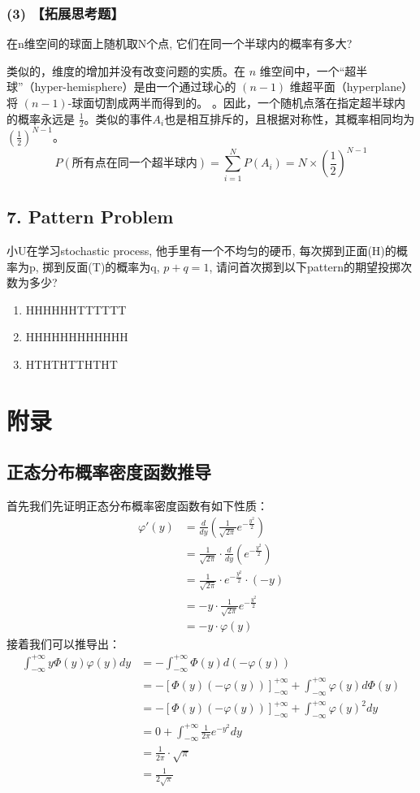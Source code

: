 \documentclass[UTF8]{ctexart}
\begin{document}
\subsubsection*{(3) 【拓展思考题】}
在n维空间的球面上随机取N个点, 它们在同一个半球内的概率有多大?

类似的，维度的增加并没有改变问题的实质。在 $n$ 维空间中，一个“超半球”（hyper-hemisphere）是由一个通过球心的 $(n-1)$ 维超平面（hyperplane）将 $(n-1)$-球面切割成两半而得到的。
。因此，一个随机点落在指定超半球内的概率永远是 $\frac{1}{2}$。类似的事件$A_i$也是相互排斥的，且根据对称性，其概率相同均为$(\frac{1}{2})^{N-1}$。
$$ P(\text{所有点在同一个超半球内}) = \sum_{i=1}^{N} P(A_i) = N \times \left(\frac{1}{2}\right)^{N-1} $$
\subsection*{7. Pattern Problem}
小U在学习stochastic process, 他手里有一个不均匀的硬币, 每次掷到正面(H)的概率为p, 掷到反面(T)的概率为q, $p+q=1$, 请问首次掷到以下pattern的期望投掷次数为多少?
\begin{enumerate}
    \item HHHHHHTTTTTT
    \item HHHHHHHHHHHH
    \item HTHTHTTHTHT
\end{enumerate}



\section*{附录}

\subsection*{正态分布概率密度函数推导}
首先我们先证明正态分布概率密度函数有如下性质：
$$
\begin{align*}
    \varphi'(y) &= \frac{d}{dy}\left(\frac{1}{\sqrt{2\pi}}e^{-\frac{y^2}{2}}\right) \\
    &= \frac{1}{\sqrt{2\pi}} \cdot \frac{d}{dy}\left(e^{-\frac{y^2}{2}}\right) \\
    &= \frac{1}{\sqrt{2\pi}} \cdot e^{-\frac{y^2}{2}} \cdot \left(-y\right) \\
    &= -y \cdot \frac{1}{\sqrt{2\pi}}e^{-\frac{y^2}{2}} \\
    &= -y \cdot \varphi(y)
\end{align*}
$$
接着我们可以推导出：
$$
\begin{align*}
    \int_{-\infty}^{+\infty} y\Phi(y)\varphi(y)dy
    &= -\int_{-\infty}^{+\infty} \Phi(y)d(-\varphi(y)) \\
    &= -\left[\Phi(y)(-\varphi(y))\right]_{-\infty}^{+\infty} + \int_{-\infty}^{+\infty} \varphi(y)d\Phi(y) \\
    &= -\left[\Phi(y)(-\varphi(y))\right]_{-\infty}^{+\infty} + \int_{-\infty}^{+\infty} \varphi(y)^2 dy \\
    &= 0 + \int_{-\infty}^{+\infty} \frac{1}{2\pi}e^{-y^2} dy \\
    &= \frac{1}{2\pi} \cdot \sqrt{\pi} \\
    &= \frac{1}{2\sqrt{\pi}}
\end{align*}
$$
\end{document}
